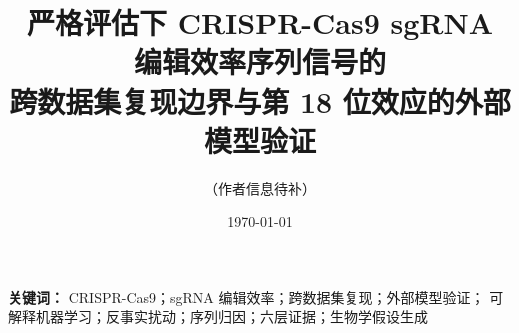 \documentclass[11pt,a4paper]{ctexart}
\title{\bfseries 严格评估下 CRISPR-Cas9 sgRNA 编辑效率序列信号的\\跨数据集复现边界与第 18 位效应的外部模型验证}
\author{（作者信息待补）}
\date{\today}
\begin{document}
\maketitle

\begin{abstract}

\end{abstract}

\noindent\textbf{关键词：} CRISPR-Cas9；sgRNA 编辑效率；跨数据集复现；外部模型验证；
可解释机器学习；反事实扰动；序列归因；六层证据；生物学假设生成












\clearpage
\appendix

\end{document}
